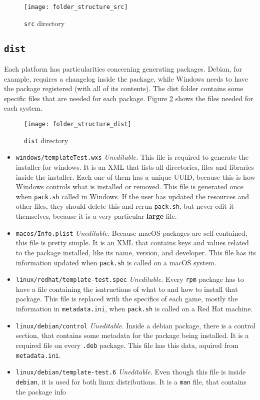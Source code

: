 \begin{figure}[h!]
\centering
\texttt{[image: folder\_structure\_src]}
\caption{\texttt{src} directory}
\label {fig:folder_structure_src}
\end{figure}

\subsection{\texttt{dist}}
\label{sec:dist_folder}

Each platform has particularities concerning generating packages. Debian, for example, requires a changelog inside the package, while Windows needs to have the package registered (with all of its contents). The dist folder contains some specific files that are needed for each package. Figure \ref{fig:folder_structure_dist} shows the files needed for each system.

\begin{figure}[h!]
\centering
\texttt{[image: folder\_structure\_dist]}
\caption{\texttt{dist} directory}
\label {fig:folder_structure_dist}
\end{figure}

\begin{itemize}
	\item \texttt{windows/templateTest.wxs} \textit{Uneditable.} This file is required to generate the installer for windows. It is an XML that lists all directories, files and libraries inside the installer. Each one of them has a unique UUID, because this is how Windows controls what is installed or removed. This file is generated once when \texttt{pack.sh} called in Windows. If the user has updated the resources and other files, they should delete this and rerun \texttt{pack.sh}, but never edit it themselves, because it is a very particular \textbf{large} file.
	\item \texttt{macos/Info.plist} \textit{Uneditable.} Because macOS packages are self-contained, this file is pretty simple. It is an XML that contains keys and values related to the package installed, like its name, version, and developer. This file has its information updated when \texttt{pack.sh} is called on a macOS system.
	\item \texttt{linux/redhat/template-test.spec} \textit{Uneditable.} Every \texttt{rpm} package has to have a file containing the isntructions of what to and how to install that package. This file is replaced with the specifics of each game, mostly the information in \texttt{metadata.ini}, when \texttt{pack.sh} is called on a Red Hat machine.
	\item \texttt{linux/debian/control} \textit{Uneditable.} Inside a debian package, there is a control section, that contains some metadata for the package being installed. It is a required file on every \texttt{.deb} package. This file has this data, aquired from \texttt{metadata.ini}.
	\item \texttt{linux/debian/template-test.6} \textit{Uneditable.} Even though this file is inside \texttt{debian}, it is used for both linux distributions. It is a \texttt{man} file, that contains the package info
\end{itemize}


